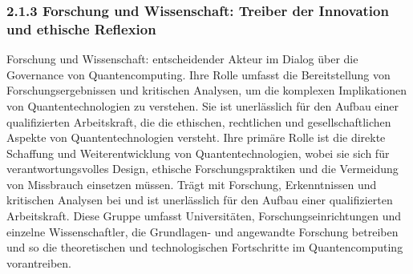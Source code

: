 \subsubsection{2.1.3 Forschung und Wissenschaft: Treiber der Innovation und ethische Reflexion}
Forschung und Wissenschaft: entscheidender Akteur im Dialog über die Governance von Quantencomputing. Ihre Rolle umfasst die Bereitstellung von Forschungsergebnissen und kritischen Analysen, um die komplexen Implikationen von Quantentechnologien zu verstehen. Sie ist unerlässlich für den Aufbau einer qualifizierten Arbeitskraft, die die ethischen, rechtlichen und gesellschaftlichen Aspekte von Quantentechnologien versteht. Ihre primäre Rolle ist die direkte Schaffung und Weiterentwicklung von Quantentechnologien, wobei sie sich für verantwortungsvolles Design, ethische Forschungspraktiken und die Vermeidung von Missbrauch einsetzen müssen.
Trägt mit Forschung, Erkenntnissen und kritischen Analysen bei und ist unerlässlich für den Aufbau einer qualifizierten Arbeitskraft. Diese Gruppe umfasst Universitäten, Forschungseinrichtungen und einzelne Wissenschaftler, die Grundlagen- und angewandte Forschung betreiben und so die theoretischen und technologischen Fortschritte im Quantencomputing vorantreiben.


